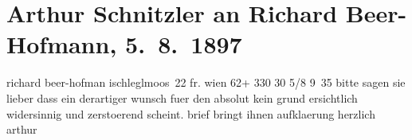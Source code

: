 

         
         \renewcommand{\erwaehntePersonen}{Personen: Richard Beer-Hofmann, Rosa Freudenthal}
         \renewcommand{\erwaehnteOrte}{Orte: Bad Ischl, Eglmoosgasse, Wien}
         \renewcommand{\erwaehnteWerke}{}
               \section[Arthur Schnitzler an Richard Beer-Hofmann, 5. 8. 1897]{ Arthur Schnitzler an Richard Beer-Hofmann, 5. 8. 1897}\nopagebreak{}\rehead{ }\begin{ledgroupsized}[t]{13cm}\normalsize\beginnumbering \toendnotes[C]{\smallbreak\pagebreak[2]} 
\toendnotes[C]{\smallbreak}\pstart{}{\pb}richard beer-hofman ischleglmoos 22\pend{}{\bigskip}\pstart
           \noindent{}fr. wien 62+ 330 30 5/8{ }9 35\pend
           \pstart
           bitte sagen sie lieber dass
               ein derartiger wunsch fuer den absolut kein grund ersichtlich widersinnig und
               zerstoerend scheint. brief bringt ihnen aufklaerung herzlich \spacefill\mbox{arthur}\pend
           
         
         \endnumbering{}\end{ledgroupsized}  \newcommand{\dateiname}{L00713}\newcommand{\titel}{Arthur Schnitzler an Richard Beer-Hofmann, 5. 8. 1897}\newcommand{\editorInnen}{Martin Anton Müller und Gerd-Hermann Susen}
      